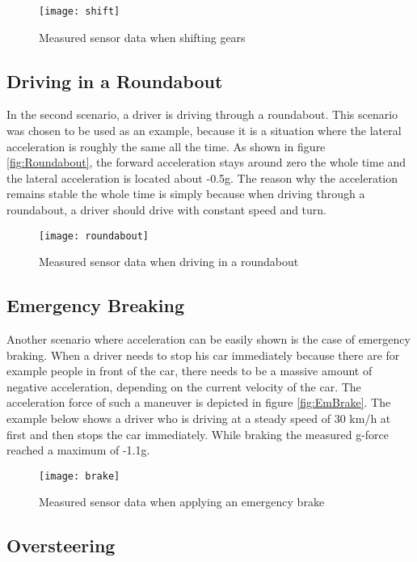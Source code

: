 \begin{figure}[h]
    \centering
    \texttt{[image: shift]}
    \caption{Measured sensor data when shifting gears}
    \label{fig:ShiftGears}
\end{figure}

\subsection{Driving in a Roundabout}
In the second scenario, a driver is driving through a roundabout. This scenario was chosen to be used as an example, because it is a situation where the lateral acceleration is roughly the same all the time. As shown in figure \vref{fig:Roundabout}, the forward acceleration stays around zero the whole time and the lateral acceleration is located about -0.5g. The reason why the acceleration remains stable the whole time is simply because when driving through a roundabout, a driver should drive with constant speed and turn.

\begin{figure}[h]
    \centering
    \texttt{[image: roundabout]}
    \caption{Measured sensor data when driving in a roundabout}
    \label{fig:Roundabout}
\end{figure}

\subsection{Emergency Breaking}
Another scenario where acceleration can be easily shown is the case of emergency braking. When a driver needs to stop his car immediately because there are for example people in front of the car, there needs to be a massive amount of negative acceleration, depending on the current velocity of the car. The acceleration force of such a maneuver is depicted in figure \vref{fig:EmBrake}. The example below shows a driver who is driving at a steady speed of 30 km/h at first and then stops the car immediately. While braking the measured g-force reached a maximum of -1.1g.


\begin{figure}[h]
    \centering
    \texttt{[image: brake]}
    \caption{Measured sensor data when applying an emergency brake}
    \label{fig:EmBrake}
\end{figure}

\subsection{Oversteering}

